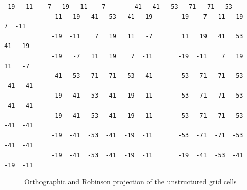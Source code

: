 \begin{lstlisting}[frame=single, backgroundcolor=\color{pyellow}, basicstyle=\footnotesize]
             -19  -11    7   19   11   -7        41   41   53   71   71   53
              11   19   41   53   41   19       -19   -7   11   19    7  -11
             -19  -11    7   19   11   -7        11   19   41   53   41   19
             -19   -7   11   19    7  -11       -19  -11    7   19   11   -7
             -41  -53  -71  -71  -53  -41       -53  -71  -71  -53  -41  -41
             -19  -41  -53  -41  -19  -11       -53  -71  -71  -53  -41  -41
             -19  -41  -53  -41  -19  -11       -53  -71  -71  -53  -41  -41
             -19  -41  -53  -41  -19  -11       -53  -71  -71  -53  -41  -41
             -19  -41  -53  -41  -19  -11       -19  -41  -53  -41  -19  -11
\end{lstlisting}

\begin{figure}[b]

\caption[cellgrid]{Orthographic and Robinson projection of the unstructured grid cells}
\end{figure}

